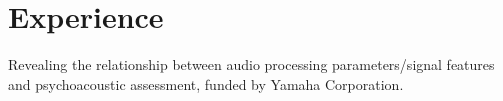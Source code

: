 \documentclass[letterpaper]{deedy-resume} %
\begin{document}
{\begin{minipage}[t]{0.33\textwidth}
\end{minipage} %
\hfill
%
%
\begin{minipage}[t]{0.66\textwidth} %


\section{Experience}

\hspace{-0.1cm}
\vspace{\topsep} %
\begin{tightitemize}
\item Revealing the relationship between audio processing parameters/signal features and psychoacoustic assessment, funded by Yamaha Corporation. 
\end{tightitemize}




\end{minipage}}
\end{document}
